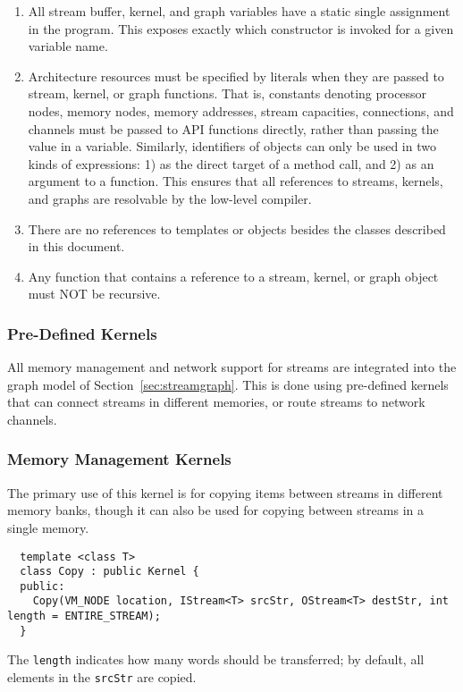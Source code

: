 \begin{enumerate}

\item All stream buffer, kernel, and graph variables have a static
single assignment in the program.  This exposes exactly which
constructor is invoked for a given variable name.

\item Architecture resources must be specified by literals when they
are passed to stream, kernel, or graph functions.  That is, constants
denoting processor nodes, memory nodes, memory addresses, stream
capacities, connections, and channels must be passed to API functions
directly, rather than passing the value in a variable.  Similarly,
identifiers of objects can only be used in two kinds of expressions:
1) as the direct target of a method call, and 2) as an argument to a
function.  This ensures that all references to streams, kernels, and
graphs are resolvable by the low-level compiler.

\item There are no references to templates or objects besides the
classes described in this document.

\item Any function that contains a reference to a stream, kernel, or
graph object must NOT be recursive.

\end{enumerate}

\subsubsection{Pre-Defined Kernels}
\label{sec:predef}

All memory management and network support for streams are integrated
into the graph model of Section~\ref{sec:streamgraph}.  This is done
using pre-defined kernels that can connect streams in different
memories, or route streams to network channels.

\subsubsection*{Memory Management Kernels}

 The primary use of this kernel is for copying items
between streams in different memory banks, though it can also be used
for copying between streams in a single memory.
{\small
\begin{verbatim}
  template <class T>
  class Copy : public Kernel {
  public:
    Copy(VM_NODE location, IStream<T> srcStr, OStream<T> destStr, int length = ENTIRE_STREAM);
  }
\end{verbatim}}
The {\tt length} indicates how many words should be transferred; by
default, all elements in the {\tt srcStr} are copied.

